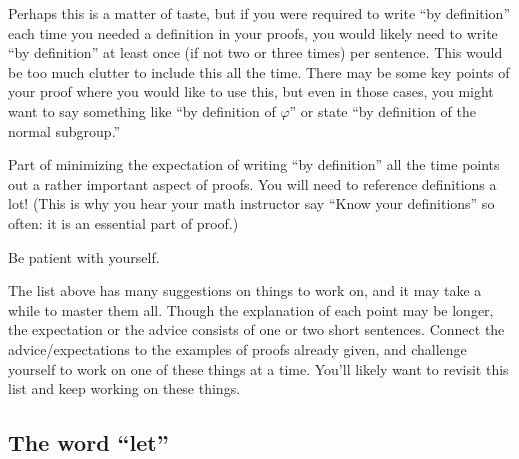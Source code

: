 \documentclass{book}
\theoremstyle{ekimcustom}
\begin{document}
Perhaps this is a matter of taste, but if you were required to write ``by definition'' each time you needed a definition in your proofs, you would likely need to write ``by definition'' at least once (if not two or three times) per sentence. This would be too much clutter to include this all the time. There may be some key points of your proof where you would like to use this, but even in those cases, you might want to say something like ``by definition of $\varphi$'' or state ``by definition of the normal subgroup.''

Part of minimizing the expectation of writing ``by definition'' all the time points out a rather important aspect of proofs. You will need to reference definitions a lot! (This is why you hear your math instructor say ``Know your definitions'' so often: it is an essential part of proof.)

\begin{bhabit}{}{}
Be patient with yourself.
\end{bhabit}
The list above has many suggestions on things to work on, and it may take a while to master them all. Though the explanation of each point may be longer, the expectation or the advice consists of one or two short sentences. Connect the advice/expectations to the examples of proofs already given, and challenge yourself to work on one of these things at a time. You'll likely want to revisit this list and keep working on these things.

\subsection{The word ``let''}
\end{document}
